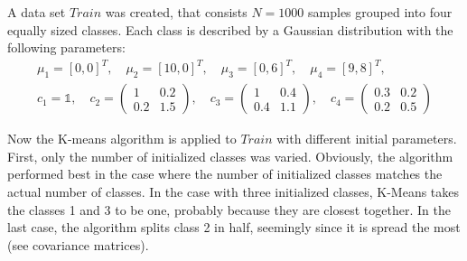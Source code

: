 \documentclass[DIV=12, ngerman, fontsize=12pt, parskip=half]{scrreprt}
\begin{document}
	A data set $Train$ was created, that consists $N = 1000$ samples grouped into four equally sized classes. Each class is described by a Gaussian distribution with the following parameters:
	\begin{align*}
		\mu_1 = [0,0]^T, \quad \mu_2 = [10,0]^T, \quad \mu_3 = [0,6]^T, \quad \mu_4 = [9,8]^T, \\
		c_1 = \mathbb{1}, \quad 
		c_2 = \begin{pmatrix}			
			1 & 0.2\\
			0.2 & 1.5
		\end{pmatrix}, \quad 
		c_3 = \begin{pmatrix}			
			1 & 0.4\\
			0.4 & 1.1
		\end{pmatrix}, \quad 
		c_4 = \begin{pmatrix}			
		0.3 & 0.2\\
		0.2 & 0.5
		\end{pmatrix}
	\end{align*}

	Now the K-means algorithm is applied to $Train$ with different initial parameters. First, only the number of initialized classes was varied. Obviously, the algorithm performed best in the case where the number of initialized classes matches the actual number of classes. In the case with three initialized classes, K-Means takes the classes 1 and 3 to be one, probably because they are closest together. In the last case, the algorithm splits class 2 in half, seemingly since it is spread the most (see covariance matrices).
	
\end{document}
